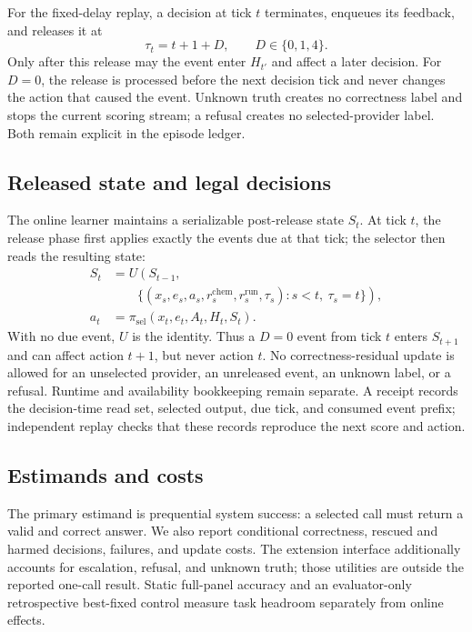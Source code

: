 \documentclass[sigconf,anonymous]{aamas}
\begin{document}
For the fixed-delay replay, a decision at tick $t$ terminates, enqueues its feedback, and releases it at
$$
\tau_t=t+1+D,\qquad D\in\{0,1,4\}.
$$
Only after this release may the event enter $H_{t'}$ and affect a later decision. For $D=0$, the release is processed before the next decision tick and never changes the action that caused the event. Unknown truth creates no correctness label and stops the current scoring stream; a refusal creates no selected-provider label. Both remain explicit in the episode ledger.

\subsection{Released state and legal decisions}
The online learner maintains a serializable post-release state $S_t$. At tick $t$, the release phase first applies exactly the events due at that tick; the selector then reads the resulting state:
$$
\begin{aligned}
S_t&=U\left(S_{t-1},\right.\\[-2pt]
&\qquad\left.\{(x_s,e_s,a_s,r_s^{\mathrm{chem}},r_s^{\mathrm{run}},\tau_s):s<t,\ \tau_s=t\}\right),\\
a_t&=\pi_{\mathrm{sel}}(x_t,e_t,A_t,H_t,S_t).
\end{aligned}
$$
With no due event, $U$ is the identity. Thus a $D=0$ event from tick $t$ enters $S_{t+1}$ and can affect action $t+1$, but never action $t$.
No correctness-residual update is allowed for an unselected provider, an unreleased event, an unknown label, or a refusal. Runtime and availability bookkeeping remain separate. A receipt records the decision-time read set, selected output, due tick, and consumed event prefix; independent replay checks that these records reproduce the next score and action.

\subsection{Estimands and costs}
The primary estimand is prequential system success: a selected call must return a valid and correct answer. We also report conditional correctness, rescued and harmed decisions, failures, and update costs. The extension interface additionally accounts for escalation, refusal, and unknown truth; those utilities are outside the reported one-call result. Static full-panel accuracy and an evaluator-only retrospective best-fixed control measure task headroom separately from online effects.
\end{document}
